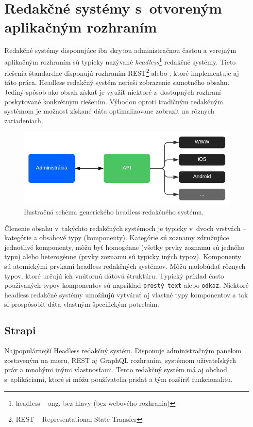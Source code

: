 \section{Redakčné systémy s~otvoreným aplikačným rozhraním}
\label{section:headless}
Redakčné systémy disponujúce iba skrytou administračnou časťou a verejným aplikačným rozhraním sú typicky nazývané \emph{headless}\footnote{headless -- ang. bez hlavy (bez webového rozhrania)} redakčné systémy. Tieto riešenia štandardne disponujú rozhraním REST\footnote{REST -- Representational State Transfer} alebo , ktoré implementuje aj táto práca. Headless redakčný systém nerieši zobrazenie samotného obsahu. Jediný spôsob ako obsah získať je využiť niektoré z~dostupných rozhraní poskytované konkrétnym riešením. Výhodou oproti tradičným redakčným systémom je možnosť získané dáta optimalizovane zobraziť na rôznych zariadeniach. 

\begin{figure}[h]
	\centering
	\includegraphics{obrazky-figures/headless_cms_graph.pdf}
	\caption{Ilustračná schéma generického headless redakčného systému.}
\end{figure}

\noindent Členenie obsahu v~takýchto redakčných systémoch je typicky v~dvoch vrstvách -- kategórie a obsahové typy (komponenty). Kategórie sú zoznamy združujúce jednotlivé komponenty, môžu byť homogénne (všetky prvky zoznamu sú jedného typu) alebo heterogénne (prvky zoznamu sú typicky iných typov). Komponenty sú atomickými prvkami headless redakčných systémov. Môžu nadobúdať rôznych typov, ktoré určujú ich vnútornú dátovú štruktúru. Typický príklad často používaných typov komponentov sú napríklad \texttt{prostý text} alebo \texttt{odkaz}. Niektoré headless redakčné systémy umožňujú vytvárať aj vlastné typy komponentov a tak si prospôsobiť dáta vlastným špecifickým potrebám.

\subsection{Strapi}
Najpopulárnejší Headless redakčný systém. Disponuje administračným panelom zostaveným na mieru, REST aj GraphQL rozhraním, systémom uživateľských práv a mnohými inými vlastnosťami. Tento redakčný systém má aj obchod s~aplikáciami, ktoré si môžu používatelia pridať a tým rozšíriť funkcionalitu. 

